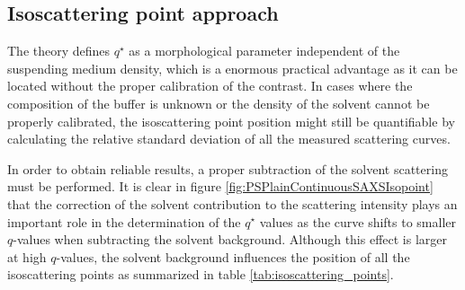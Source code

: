 \subsection{Isoscattering point approach}
\label{sec:EvaluationIsopoint}

The theory defines $q^{\star}$ as a morphological parameter independent of the suspending medium density, which is a enormous practical advantage as it can be located without the proper calibration of the contrast. In cases where the composition of the buffer is unknown or the density of the solvent cannot be properly calibrated, the isoscattering point position might still be quantifiable by calculating the relative standard deviation of all the measured scattering curves. 

In order to obtain reliable results, a proper subtraction of the solvent scattering must be performed. It is clear in figure \ref{fig:PSPlainContinuousSAXSIsopoint} that the correction of the solvent contribution to the scattering intensity plays an important role in the determination of the $q^{\star}$ values as the curve shifts to smaller $q$-values when subtracting the solvent background. Although this effect is larger at high $q$-values, the solvent background influences the position of all the isoscattering points as summarized in table \ref{tab:isoscattering_points}. 


